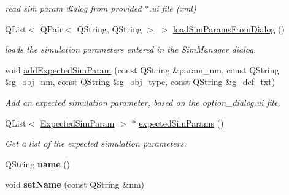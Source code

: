 \begin{DoxyCompactItemize}
\begin{DoxyCompactList}\small\item\em read sim param dialog from provided $\ast$.ui file (xml) \end{DoxyCompactList}\item 
Q\+List$<$ Q\+Pair$<$ Q\+String, Q\+String $>$ $>$ \hyperlink{classprim_1_1SimEngine_a6a8554333d94860f779757df65f234fa}{load\+Sim\+Params\+From\+Dialog} ()\hypertarget{classprim_1_1SimEngine_a6a8554333d94860f779757df65f234fa}{}\label{classprim_1_1SimEngine_a6a8554333d94860f779757df65f234fa}

\begin{DoxyCompactList}\small\item\em loads the simulation parameters entered in the Sim\+Manager dialog. \end{DoxyCompactList}\item 
void \hyperlink{classprim_1_1SimEngine_a5625245f1624d1692412ddde69351954}{add\+Expected\+Sim\+Param} (const Q\+String \&param\+\_\+nm, const Q\+String \&g\+\_\+obj\+\_\+nm, const Q\+String \&g\+\_\+obj\+\_\+type, const Q\+String \&g\+\_\+def\+\_\+txt)\hypertarget{classprim_1_1SimEngine_a5625245f1624d1692412ddde69351954}{}\label{classprim_1_1SimEngine_a5625245f1624d1692412ddde69351954}

\begin{DoxyCompactList}\small\item\em Add an expected simulation parameter, based on the option\+\_\+dialog.\+ui file. \end{DoxyCompactList}\item 
Q\+List$<$ \hyperlink{structprim_1_1SimEngine_1_1ExpectedSimParam}{Expected\+Sim\+Param} $>$ $\ast$ \hyperlink{classprim_1_1SimEngine_a2b6938b75cc52af1706293e524d2e0e3}{expected\+Sim\+Params} ()\hypertarget{classprim_1_1SimEngine_a2b6938b75cc52af1706293e524d2e0e3}{}\label{classprim_1_1SimEngine_a2b6938b75cc52af1706293e524d2e0e3}

\begin{DoxyCompactList}\small\item\em Get a list of the expected simulation parameters. \end{DoxyCompactList}\item 
Q\+String {\bfseries name} ()\hypertarget{classprim_1_1SimEngine_ac51ca94b1db796d9a3110d5bb9c09572}{}\label{classprim_1_1SimEngine_ac51ca94b1db796d9a3110d5bb9c09572}

\item 
void {\bfseries set\+Name} (const Q\+String \&nm)\hypertarget{classprim_1_1SimEngine_a832720d30a02500604b9a374b02a17f0}{}\label{classprim_1_1SimEngine_a832720d30a02500604b9a374b02a17f0}


\end{DoxyCompactItemize}
